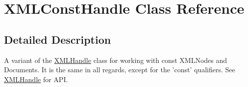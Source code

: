\hypertarget{classtinyxml2_1_1_x_m_l_const_handle}{\section{X\-M\-L\-Const\-Handle Class Reference}
\label{classtinyxml2_1_1_x_m_l_const_handle}
}


\subsection{Detailed Description}
A variant of the \hyperlink{classtinyxml2_1_1_x_m_l_handle}{X\-M\-L\-Handle} class for working with const X\-M\-L\-Nodes and Documents. It is the same in all regards, except for the 'const' qualifiers. See \hyperlink{classtinyxml2_1_1_x_m_l_handle}{X\-M\-L\-Handle} for A\-P\-I. 